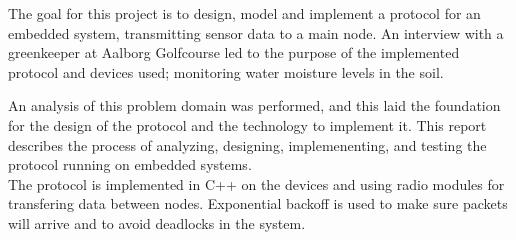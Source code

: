 The goal for this project is to design, model and implement a protocol for an embedded system, transmitting sensor data to a main node. An interview with a greenkeeper at Aalborg Golfcourse led to the purpose of the implemented protocol and devices used; monitoring water moisture levels in
 the soil.

An analysis of this problem domain was performed, and this laid the foundation for the design of the protocol and the technology to implement it.
This report describes the process of analyzing, designing, implemenenting, and testing the protocol running on embedded systems. \\
The protocol is implemented in C++ on the devices and using radio modules for transfering data between nodes. Exponential backoff is used to make sure packets will arrive and to avoid deadlocks in the system. \\ 